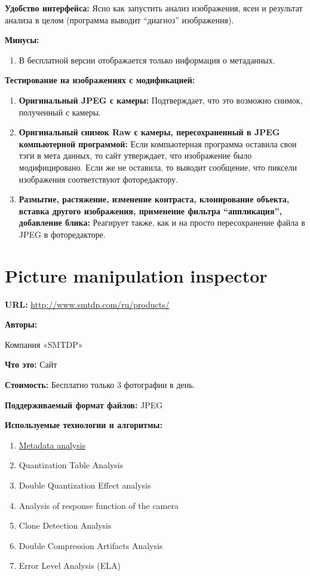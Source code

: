 \textbf{Удобство интерфейса:}
Ясно как запустить анализ изображения, ясен и результат анализа в целом (программа выводит “диагноз” изображения). 

\textbf{Минусы:}
\begin{enumerate}
  \item	В бесплатной версии отображается только информация о метаданных.
\end{enumerate}

\textbf{Тестирование на изображениях с модификацией:}
\begin{enumerate}
\item \textbf{Оригинальный JPEG с камеры:}
Подтверждает, что это возможно снимок, полученный с камеры.
\item \textbf{Оригинальный снимок Raw с камеры, пересохраненный в JPEG компьютерной программой:}
Если компьютерная программа оставила свои тэги в мета данных, то сайт утверждает, что изображение было модифицировано. Если же не оставила, то выводит сообщение, что пиксели изображения соответствуют фоторедактору.

\item \textbf{Размытие, растяжение, изменение контраста, клонирование объекта, вставка другого изображения, применение фильтра “аппликация”, добавление блика:}
Реагирует также, как и на просто пересохранение файла в JPEG в фоторедакторе.
\end{enumerate}

\newpage

\section{Picture manipulation inspector}

\textbf{URL: } \url{http://www.smtdp.com/ru/products/}

\textbf{Авторы:}

Компания «SMTDP»

\textbf{Что это:} Сайт

\textbf{Стоимость:} Бесплатно только 3 фотографии в день.

\textbf{Поддерживаемый формат файлов:} JPEG

\textbf{Используемые технологии и алгоритмы:}

\begin{enumerate}
  \item \href{http://fotoforensics.com/tutorial-meta.php}{Metadata analysis}
  \item Quantization Table Analysis
  
  \item Double Quantization Effect analysis
  
  \item Analysis of response function of the camera 
  
  \item Clone Detection Analysis
  
  \item Double Compression Artifacts Analysis
  
  \item Error Level Analysis (ELA)
\end{enumerate} 

